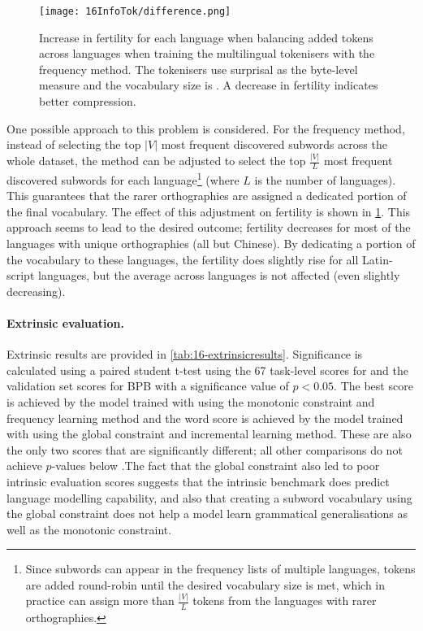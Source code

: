 \begin{figure}[!t]
    \centering
    \texttt{[image: 16InfoTok/difference.png]}
    \caption{Increase in fertility for each language when balancing added tokens across languages when training the multilingual \tokname tokenisers with the frequency method. The tokenisers use surprisal as the byte-level measure and the vocabulary size is . A decrease in fertility indicates better compression.}
    \label{fig:16-difference}
\end{figure}

One possible approach to this problem is considered. For the frequency method, instead of selecting the top $|V|$ most frequent discovered subwords across the whole dataset, the method can be adjusted to select the top $\frac{|V|}{L}$ most frequent discovered subwords for each language\footnote{Since subwords can appear in the frequency lists of multiple languages, tokens are added round-robin until the desired vocabulary size is met, which in practice can assign more than $\frac{|V|}{L}$ tokens from the languages with rarer orthographies.} (where $L$ is the number of languages). This guarantees that the rarer orthographies are assigned a dedicated portion of the final vocabulary. The effect of this adjustment on fertility is shown in \cref{fig:16-difference}. This approach seems to lead to the desired outcome; fertility decreases for most of the languages with unique orthographies (all but Chinese). By dedicating a portion of the vocabulary to these languages, the fertility does slightly rise for all Latin-script languages, but the average across languages is not affected (even slightly decreasing). 

\paragraph{Extrinsic evaluation.}

Extrinsic results are provided in \cref{tab:16-extrinsicresults}. Significance is calculated using a paired student t-test using the 67 task-level scores for \blimp and the  validation set scores for BPB with a significance value of $p<0.05$. The best \blimp score is achieved by the model trained with \tokname using the monotonic constraint and frequency learning method and the word score is achieved by the model trained with \tokname using the global constraint and incremental learning method. These are also the only two scores that are significantly different; all other comparisons do not achieve $p$-values below .The fact that the global constraint also led to poor intrinsic evaluation scores suggests that the intrinsic benchmark does predict language modelling capability, and also that creating a subword vocabulary using the global constraint does not help a model learn grammatical generalisations as well as the monotonic constraint. 

